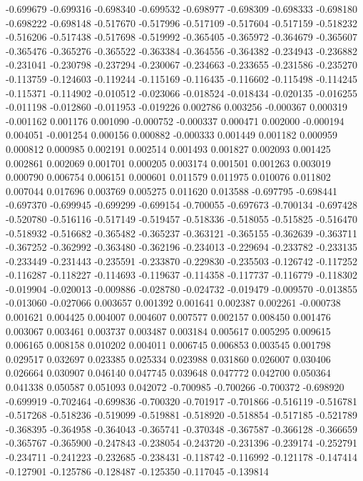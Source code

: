 -0.699679
-0.699316
-0.698340
-0.699532
-0.698977
-0.698309
-0.698333
-0.698180
-0.698222
-0.698148
-0.517670
-0.517996
-0.517109
-0.517604
-0.517159
-0.518232
-0.516206
-0.517438
-0.517698
-0.519992
-0.365405
-0.365972
-0.364679
-0.365607
-0.365476
-0.365276
-0.365522
-0.363384
-0.364556
-0.364382
-0.234943
-0.236882
-0.231041
-0.230798
-0.237294
-0.230067
-0.234663
-0.233655
-0.231586
-0.235270
-0.113759
-0.124603
-0.119244
-0.115169
-0.116435
-0.116602
-0.115498
-0.114245
-0.115371
-0.114902
-0.010512
-0.023066
-0.018524
-0.018434
-0.020135
-0.016255
-0.011198
-0.012860
-0.011953
-0.019226
0.002786
0.003256
-0.000367
0.000319
-0.001162
0.001176
0.001090
-0.000752
-0.000337
0.000471
0.002000
-0.000194
0.004051
-0.001254
0.000156
0.000882
-0.000333
0.001449
0.001182
0.000959
0.000812
0.000985
0.002191
0.002514
0.001493
0.001827
0.002093
0.001425
0.002861
0.002069
0.001701
0.000205
0.003174
0.001501
0.001263
0.003019
0.000790
0.006754
0.006151
0.000601
0.011579
0.011975
0.010076
0.011802
0.007044
0.017696
0.003769
0.005275
0.011620
0.013588
-0.697795
-0.698441
-0.697370
-0.699945
-0.699299
-0.699154
-0.700055
-0.697673
-0.700134
-0.697428
-0.520780
-0.516116
-0.517149
-0.519457
-0.518336
-0.518055
-0.515825
-0.516470
-0.518932
-0.516682
-0.365482
-0.365237
-0.363121
-0.365155
-0.362639
-0.363711
-0.367252
-0.362992
-0.363480
-0.362196
-0.234013
-0.229694
-0.233782
-0.233135
-0.233449
-0.231443
-0.235591
-0.233870
-0.229830
-0.235503
-0.126742
-0.117252
-0.116287
-0.118227
-0.114693
-0.119637
-0.114358
-0.117737
-0.116779
-0.118302
-0.019904
-0.020013
-0.009886
-0.028780
-0.024732
-0.019479
-0.009570
-0.013855
-0.013060
-0.027066
0.003657
0.001392
0.001641
0.002387
0.002261
-0.000738
0.001621
0.004425
0.004007
0.004607
0.007577
0.002157
0.008450
0.001476
0.003067
0.003461
0.003737
0.003487
0.003184
0.005617
0.005295
0.009615
0.006165
0.008158
0.010202
0.004011
0.006745
0.006853
0.003545
0.001798
0.029517
0.032697
0.023385
0.025334
0.023988
0.031860
0.026007
0.030406
0.026664
0.030907
0.046140
0.047745
0.039648
0.047772
0.042700
0.050364
0.041338
0.050587
0.051093
0.042072
-0.700985
-0.700266
-0.700372
-0.698920
-0.699919
-0.702464
-0.699836
-0.700320
-0.701917
-0.701866
-0.516119
-0.516781
-0.517268
-0.518236
-0.519099
-0.519881
-0.518920
-0.518854
-0.517185
-0.521789
-0.368395
-0.364958
-0.364043
-0.365741
-0.370348
-0.367587
-0.366128
-0.366659
-0.365767
-0.365900
-0.247843
-0.238054
-0.243720
-0.231396
-0.239174
-0.252791
-0.234711
-0.241223
-0.232685
-0.238431
-0.118742
-0.116992
-0.121178
-0.147414
-0.127901
-0.125786
-0.128487
-0.125350
-0.117045
-0.139814
